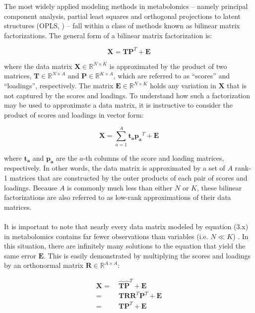 \begin{doublespace}
The most widely applied modeling methods in metabolomics -- namely principal
component analysis, partial least squares and orthogonal projections to latent
structures (OPLS, \cite{trygg:jchemo2002}) -- fall within a class of methods
known as bilinear matrix factorizations. The general form of a bilinear matrix
factorization is:

\begin{equation}
\mathbf{X} = \mathbf{T} \mathbf{P}^T + \mathbf{E}
\end{equation}

where the data matrix $\mathbf{X} \in \mathbb{R}^{N \times K}$ is approximated
by the product of two matrices, $\mathbf{T} \in \mathbb{R}^{N \times A}$ and
$\mathbf{P} \in \mathbb{R}^{K \times A}$, which are referred to as ``scores''
and ``loadings'', respectively. The matrix
$\mathbf{E} \in \mathbb{R}^{N \times K}$ holds any variation in $\mathbf{X}$
that is not captured by the scores and loadings. To understand how such a
factorization may be used to approximate a data matrix, it is instructive to
consider the product of scores and loadings in vector form:

\begin{equation}
\mathbf{X} = \sum_{a=1}^A \mathbf{t_a} \mathbf{p_a}^T + \mathbf{E}
\end{equation}

where $\mathbf{t_a}$ and $\mathbf{p_a}$ are the $a$-th columns of the score
and loading matrices, respectively. In other words, the data matrix is
approximated by a set of $A$ rank-1 matrices that are constructed by the
outer products of each pair of scores and loadings. Because $A$ is commonly
much less than either $N$ or $K$, these bilinear factorizations are also
referred to as low-rank approximations of their data matrices.
\\\\
It is important to note that nearly every data matrix modeled by equation (3.x)
in metabolomics contains far fewer observations than variables
(i.e. $N \ll K$) \cite{worley:cmb2013}. In this situation, there are infinitely
many solutions to the equation that yield the same error $\mathbf{E}$. This is
easily demonstrated by multiplying the scores and loadings by an orthonormal
matrix $\mathbf{R} \in \mathbb{R}^{A \times A}$:

\begin{align}
\mathbf{X}
 =& \: \hat{\mathbf{T}} \hat{\mathbf{P}}^T + \mathbf{E}
\nonumber \\
 =& \: \mathbf{T} \mathbf{R} \mathbf{R}^T \mathbf{P}^T + \mathbf{E}
\nonumber \\
 =& \: \mathbf{T} \mathbf{P}^T + \mathbf{E}
\end{align}


\end{doublespace}
